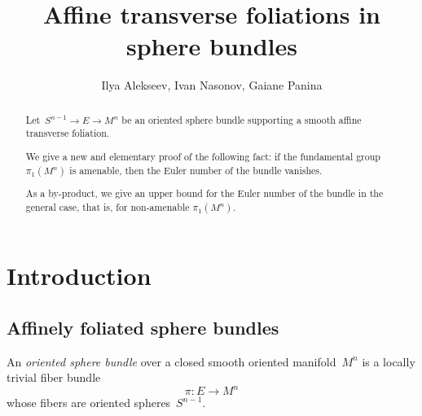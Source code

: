 \documentclass[12pt]{amsart}
\theoremstyle{plain}
\theoremstyle{definition}
\theoremstyle{plain}
\theoremstyle{definition}
\begin{document}
	
	
	
	
	\title{Affine transverse foliations in sphere bundles}
	
	
	\author{Ilya Alekseev, Ivan Nasonov,   Gaiane Panina }
	
	\address{I. Alekseev: St. Petersburg State University; G. Panina:  St. Petersburg State University; gaiane-panina@rambler.ru; Ivan Nasonov: St. Petersburg State University}
	
	
	
	
	
	
	
	
	
	\begin{abstract}  Let~$S^{n-1}\rightarrow E \rightarrow M^n$ be an oriented sphere bundle  supporting a {smooth} affine transverse foliation.

We  give a new and elementary proof of the following fact: if  the fundamental group  {$\pi_1(M^n)$} is amenable, then the Euler number of the bundle vanishes. 

As a by-product, we  give an upper bound for the Euler number of the bundle in the general case, that is, for non-amenable {$\pi_1(M^n)$}. 




	\end{abstract}
	
	
	
	
	
	\maketitle
	
	
	
\section{Introduction}\label{SecIntro}
	


\subsection{Affinely foliated sphere bundles}
{An \textit{oriented sphere bundle} over a closed smooth oriented manifold~$M^n$ is }a locally trivial fiber bundle
$$\pi:E\rightarrow M^n$$ whose fibers are oriented spheres~$S^{n-1}$.
\end{document}
